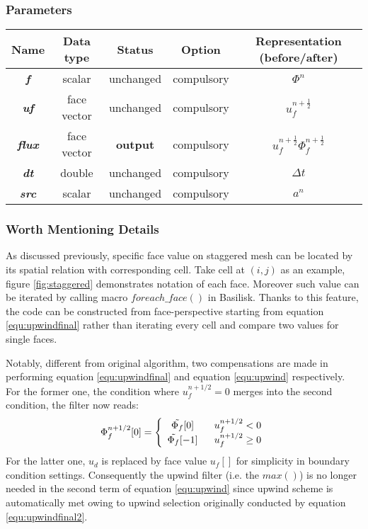 \documentclass[a4paper]{article}
\newcommand{\para}[1]{\textbf{\emph{\textcolor{para}{#1}}}}
\begin{document}
\subsubsection{Parameters}
\begin{center}
  \begin{tabular}{|c|c|c|c|c|}
    \hline
    Name & Data type & Status & Option & Representation (before/after)\\[0.5ex]
    \hline\hline
    \para{f} & scalar & unchanged & compulsory & $\Phi^n$\\
    \hline
    \para{uf} & face vector & unchanged & compulsory & $u_f^{n+ \frac{1}{2}}$\\
    \hline
    \rowcolor{output} \para{flux} & face vector & \textbf{output} & compulsory & $u_f^{n+ \frac{1}{2}}\Phi_f^{n+\frac{1}{2}}$\\
    \hline
    \para{dt} & double & unchanged & compulsory & $\Delta t$\\
    \hline
    \para{src} & scalar & unchanged & compulsory & $ a^n$ \\
    \hline
  \end{tabular}
\end{center}

\subsubsection{Worth Mentioning Details}\label{sec:tracerdetail}
As discussed previously, specific face value on staggered mesh\cite{1965_Harlow} can be located by its spatial relation with corresponding cell. Take cell at $(i,j)$ as an example, figure \ref{fig:staggered} demonstrates notation of each face. Moreover such value can be iterated by calling macro $foreach\_face()$ in Basilisk. Thanks to this feature, the code can be constructed from face-perspective starting from equation \ref{equ:upwindfinal} rather than iterating every cell and compare two values for single faces.\par
Notably, different from original algorithm, two compensations are made in performing equation \ref{equ:upwindfinal} and equation \ref{equ:upwind} respectively. For the former one, the condition where $u_f^{n+1/2}=0$ merges into the second condition, the filter now reads:
\begin{equation}
    \Phi^{n+1/2}_{f}[0] = \left\{
    \begin{array}{cc}
         \Tilde{\Phi_f}[0]\ \ &u^{n+1/2}_f<0\\
         \Tilde{\Phi_f}[-1]\ \ &u^{n+1/2}_f\geq0
    \end{array}
    \right.
    \label{equ:upwindfinal2}
\end{equation}
For the latter one, $u_d$ is replaced by face value $u_f[]$ for simplicity in boundary condition settings. Consequently the upwind filter (i.e. the $max()$) is no longer needed in the second term of equation \ref{equ:upwind} since upwind scheme is automatically met owing to upwind selection originally conducted by equation \ref{equ:upwindfinal2}. 
\end{document}
